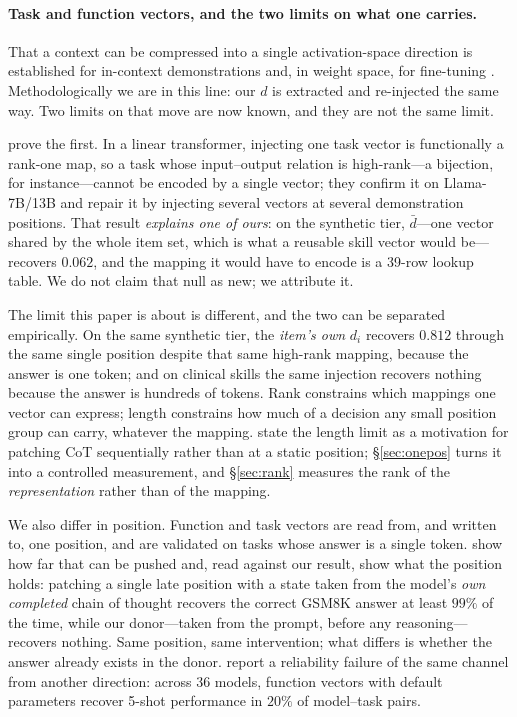 \documentclass{article}
\newcommand{\dvec}{\ensuremath{d}}
\begin{document}
\paragraph{Task and function vectors, and the two limits on what one carries.}
That a context can be compressed into a single activation-space direction is
established for in-context demonstrations \citep{hendel2023taskvectors,
todd2024functionvectors} and, in weight space, for fine-tuning
\citep{ilharco2023taskarithmetic}. Methodologically we are in this line: our
$\dvec$ is extracted and re-injected the same way. Two limits on that move are
now known, and they are not the same limit.

\citet{dong2026taskvectorlimits} prove the first. In a linear transformer,
injecting one task vector is functionally a rank-one map, so a task whose
input--output relation is high-rank---a bijection, for instance---cannot be
encoded by a single vector; they confirm it on Llama-7B/13B and repair it by
injecting several vectors at several demonstration positions. That result
\emph{explains one of ours}: on the synthetic tier, $\bar{\dvec}$---one vector
shared by the whole item set, which is what a reusable skill vector would
be---recovers $0.062$, and the mapping it would have to encode is a 39-row
lookup table. We do not claim that null as new; we attribute it.

The limit this paper is about is different, and the two can be separated
empirically. On the same synthetic tier, the \emph{item's own} $\dvec_i$
recovers $0.812$ through the same single position despite that same high-rank
mapping, because the answer is one token; and on clinical skills the same
injection recovers nothing because the answer is hundreds of tokens. Rank
constrains which mappings one vector can express; length constrains how much of
a decision any small position group can carry, whatever the mapping.
\citet{dura2026sequentialpatching} state the length limit as a motivation for
patching CoT sequentially rather than at a static position; \S\ref{sec:onepos}
turns it into a controlled measurement, and \S\ref{sec:rank} measures the rank
of the \emph{representation} rather than of the mapping.

We also differ in position. Function and task vectors are read from, and written
to, one position, and are validated on tasks whose answer is a single token.
\citet{mehrafarin2026cothidden} show how far that can be pushed and, read
against our result, show what the position holds: patching a single late
position with a state taken from the model's \emph{own completed} chain of
thought recovers the correct GSM8K answer at least $99\%$ of the time, while our
donor---taken from the prompt, before any reasoning---recovers nothing. Same
position, same intervention; what differs is whether the answer already exists
in the donor. \citet{dasilva2025steeringoff} report a reliability failure of the
same channel from another direction: across 36 models, function vectors with
default parameters recover 5-shot performance in $20\%$ of model--task pairs.
\end{document}
